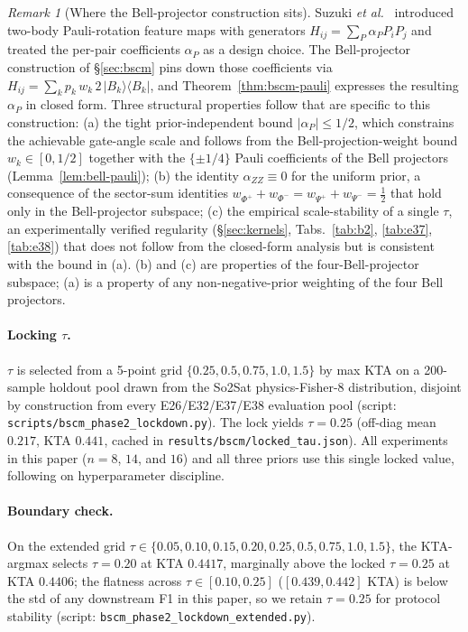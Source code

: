 \documentclass[pdflatex,sn-mathphys]{sn-jnl}
\theoremstyle{plain}
\theoremstyle{remark}
\newtheorem{remark}{Remark}
\theoremstyle{definition}
\begin{document}
\begin{remark}[Where the Bell-projector construction sits]\label{rem:bell-position}
Suzuki \emph{et al.}\ \cite{suzuki2020} introduced two-body Pauli-rotation feature maps with generators $H_{ij}=\sum_P \alpha_P P_iP_j$ and treated the per-pair coefficients $\alpha_P$ as a design choice.  The Bell-projector construction of \S\ref{sec:bscm} pins down those coefficients via $H_{ij}=\sum_k p_k\,w_k\,2\,|B_k\rangle\!\langle B_k|$, and Theorem~\ref{thm:bscm-pauli} expresses the resulting $\alpha_P$ in closed form.  Three structural properties follow that are specific to this construction: (a) the tight prior-independent bound $|\alpha_P|\le 1/2$, which constrains the achievable gate-angle scale and follows from the Bell-projection-weight bound $w_k\in[0,1/2]$ together with the $\{\pm 1/4\}$ Pauli coefficients of the Bell projectors (Lemma~\ref{lem:bell-pauli}); (b) the identity $\alpha_{ZZ}\equiv 0$ for the uniform prior, a consequence of the sector-sum identities $w_{\Phi^+}+w_{\Phi^-}=w_{\Psi^+}+w_{\Psi^-}=\tfrac{1}{2}$ that hold only in the Bell-projector subspace; (c) the empirical scale-stability of a single $\tau$, an experimentally verified regularity (\S\ref{sec:kernels}, Tabs.~\ref{tab:b2}, \ref{tab:e37}, \ref{tab:e38}) that does not follow from the closed-form analysis but is consistent with the bound in (a).  (b) and (c) are properties of the four-Bell-projector subspace; (a) is a property of any non-negative-prior weighting of the four Bell projectors.
\end{remark}

\paragraph{Locking $\tau$.}
$\tau$ is selected from a 5-point grid $\{0.25,0.5,0.75,1.0,1.5\}$ by max KTA on a 200-sample holdout pool drawn from the So2Sat physics-Fisher-8 distribution, disjoint by construction from every E26/E32/E37/E38 evaluation pool (script: \texttt{scripts/bscm\_phase2\_lockdown.py}). The lock yields $\tau=0.25$ (off-diag mean $0.217$, KTA $0.441$, cached in \texttt{results/bscm/locked\_tau.json}). All experiments in this paper ($n=8$, $14$, and $16$) and all three priors use this single locked value, following \cite{schnabel2025} on hyperparameter discipline.

\paragraph{Boundary check.}
On the extended grid $\tau\in\{0.05, 0.10, 0.15, 0.20, 0.25, 0.5, 0.75, 1.0, 1.5\}$, the KTA-argmax selects $\tau=0.20$ at KTA $0.4417$, marginally above the locked $\tau=0.25$ at KTA $0.4406$; the flatness across $\tau\in[0.10, 0.25]$ ($[0.439, 0.442]$ KTA) is below the std of any downstream F1 in this paper, so we retain $\tau=0.25$ for protocol stability (script: \texttt{bscm\_phase2\_lockdown\_extended.py}).
\end{document}
